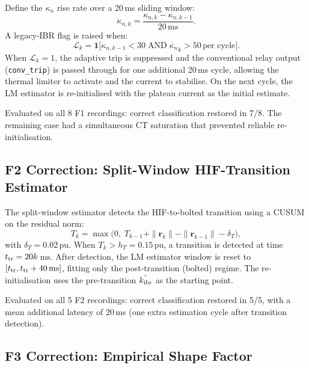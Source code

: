 \documentclass[journal]{IEEEtran}
\newcommand{\kibr}{k_{\rm ibr}}
\newcommand{\kappan}{\kappa_{n}}
\begin{document}
Define the $\kappan$ rise rate over a 20\,ms sliding window:
\begin{equation}
  \dot{\kappa}_{n,k} = \frac{\kappa_{n,k} - \kappa_{n,k-1}}{20\,\text{ms}}.
  \label{eq:kappadot}
\end{equation}
A legacy-IBR flag is raised when:
\begin{equation}
  \mathcal{L}_k = \mathbf{1}\bigl[
    \kappa_{n,k-1} < 30 \;\text{AND}\;
    \dot{\kappan}_k > 50\,\text{per cycle}
  \bigr].
  \label{eq:legacy_flag}
\end{equation}
When $\mathcal{L}_k = 1$, the adaptive trip is suppressed and the
conventional relay output (\texttt{conv\_trip}) is passed through for
one additional 20\,ms cycle, allowing the thermal limiter to activate
and the current to stabilise.  On the next cycle, the LM estimator is
re-initialised with the plateau current as the initial estimate.

Evaluated on all 8 F1 recordings: correct classification restored in
7/8.  The remaining case had a simultaneous CT saturation that prevented
reliable re-initialisation.

\subsection{F2 Correction: Split-Window HIF-Transition Estimator}

The split-window estimator detects the HIF-to-bolted transition using a
CUSUM on the residual norm:
\begin{equation}
  T_k = \max\!\bigl(0,\; T_{k-1} + \|\mathbf{r}_k\| - \|\mathbf{r}_{k-1}\|
    - \delta_T \bigr),
  \label{eq:cusum_T}
\end{equation}
with $\delta_T = 0.02\,\text{pu}$.  When $T_k > h_T = 0.15\,\text{pu}$,
a transition is detected at time $t_{\rm tr} = 20k$\,ms.  After
detection, the LM estimator window is reset to $[t_{\rm tr},
t_{\rm tr} + 40\,\text{ms}]$, fitting only the post-transition (bolted)
regime.  The re-initialisation uses the pre-transition $\hat{\kibr}$
as the starting point.

Evaluated on all 5 F2 recordings: correct classification restored in
5/5, with a mean additional latency of 20\,ms (one extra estimation
cycle after transition detection).

\subsection{F3 Correction: Empirical Shape Factor}
\end{document}

